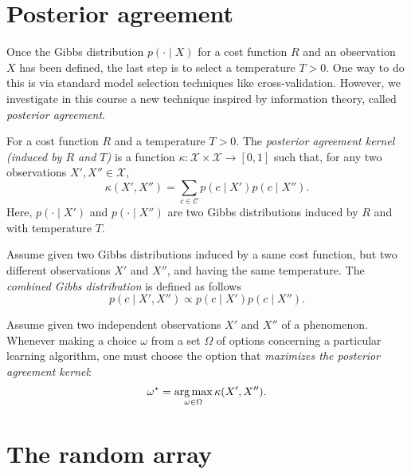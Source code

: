 \section{Posterior agreement}
\label{sec:pa_mepa}

Once the Gibbs distribution $p(\cdot \mid X)$ for a cost function $R$ and an observation $X$ has been defined, the last step is to select a temperature $T > 0$. One way to do this is via standard model selection techniques like cross-validation. However, we investigate in this course a new technique inspired by information theory, called \emph{posterior agreement}.

\begin{definition}
For a cost function $R$ and a temperature $T > 0$.  The \emph{posterior agreement kernel (induced by $R$ and $T$)} is a function $\kappa : \mathcal{X} \times \mathcal{X} \to [0,1]$ such that, for any two observations $X', X'' \in \mathcal{X}$,
%
\begin{equation}
\kappa(X', X'') = \sum_{c \in \mathcal{C}} p(c \mid X') p(c \mid X'').
\end{equation}
%
Here, $p(\cdot \mid X')$ and $p(\cdot \mid X'')$ are two Gibbs distributions induced by $R$ and with temperature $T$.
\end{definition}

\begin{definition}
Assume given two Gibbs distributions induced by a same cost function, but two different observations $X'$ and $X''$, and having the same temperature.
The \emph{combined Gibbs distribution} is defined as follows
%
\begin{equation}
p(c \mid X', X'') \propto p(c \mid X') p(c \mid X'').
\end{equation}
%
\end{definition}

\begin{definition}
Assume given two independent observations $X'$ and $X''$ of a phenomenon. Whenever making a choice $\omega$ from a set $\Omega$ of options concerning a particular learning algorithm, one must choose the option that \emph{maximizes the posterior agreement kernel}:
%
\begin{equation}
\omega^* = \operatorname*{arg\,max}_{\omega \in \Omega} \kappa(X', X'').
\end{equation}
%
\end{definition}

\section{The random array}
\label{sec:random_array}

